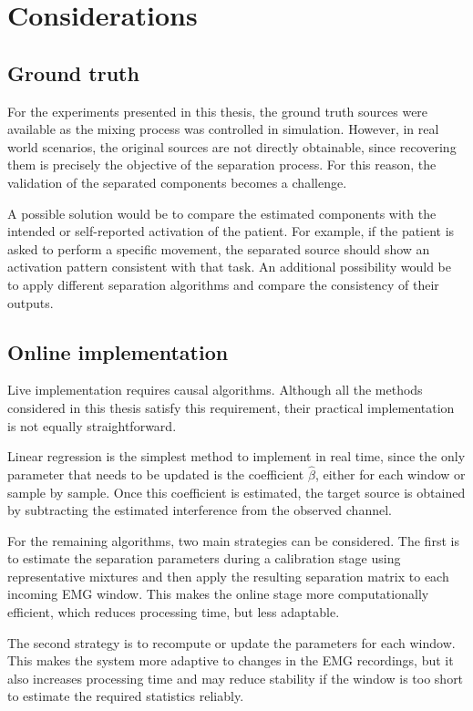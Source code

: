\section{Considerations}

\subsection{Ground truth}

For the experiments presented in this thesis, the ground truth sources were available as the mixing process was controlled in simulation. However, in real world scenarios, the original sources are not directly obtainable, since recovering them is precisely the objective of the separation process. For this reason, the validation of the separated components becomes a challenge.

A possible solution would be to compare the estimated components with the intended or self-reported activation of the patient. For example, if the patient is asked to perform a specific movement, the separated source should show an activation pattern consistent with that task. An additional possibility would be to apply different separation algorithms and compare the consistency of their outputs.

\subsection{Online implementation}

Live implementation requires causal algorithms. Although all the methods considered in this thesis satisfy this requirement, their practical implementation is not equally straightforward.

Linear regression is the simplest method to implement in real time, since the only parameter that needs to be updated is the coefficient $\hat{\beta}$, either for each window or sample by sample. Once this coefficient is estimated, the target source is obtained by subtracting the estimated interference from the observed channel.

For the remaining algorithms, two main strategies can be considered. The first is to estimate the separation parameters during a calibration stage using representative mixtures and then apply the resulting separation matrix to each incoming EMG window. This makes the online stage more computationally efficient, which reduces processing time, but less adaptable.

The second strategy is to recompute or update the parameters for each window. This makes the system more adaptive to changes in the EMG recordings, but it also increases processing time and may reduce stability if the window is too short to estimate the required statistics reliably.


